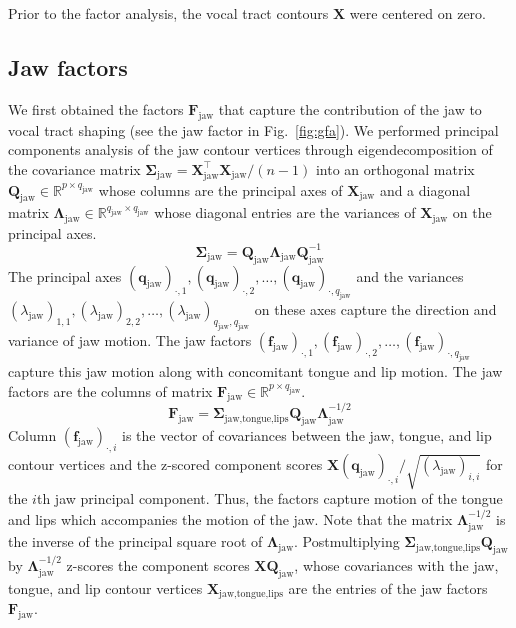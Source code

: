 \documentclass[reprint]{JASAnew}\usepackage[]{graphicx}\usepackage[]{color}
\begin{document}
Prior to the factor analysis, the vocal tract contours $\mathbf{X}$ were centered on zero.





\subsection{Jaw factors}
\label{subsec:jawfactors}

We first obtained the factors $\mathbf{F}_\text{jaw}$ that capture the contribution of the jaw to vocal tract shaping (see the jaw factor in Fig.~\ref{fig:gfa}). 
% 
We performed principal components analysis of the jaw contour vertices through eigendecomposition of the covariance matrix $\boldsymbol{\Sigma}_\text{jaw} = \mathbf{X}_\text{jaw}^\intercal \mathbf{X}_\text{jaw}/(n-1)$ into an orthogonal matrix $\mathbf{Q}_\text{jaw} \in \mathbb{R}^{p\times q_\text{jaw}}$ whose columns are the principal axes of $\mathbf{X}_\text{jaw}$ and a diagonal matrix $\boldsymbol{\Lambda}_\text{jaw} \in \mathbb{R}^{q_\text{jaw} \times q_\text{jaw}}$ whose diagonal entries are the variances of $\mathbf{X}_\text{jaw}$ on the principal axes.
% 
\begin{equation}
\boldsymbol{\Sigma}_\text{jaw} = \mathbf{Q}_\text{jaw}\boldsymbol{\Lambda}_\text{jaw} \mathbf{Q}_\text{jaw}^{-1}
\end{equation}
%
The principal axes $(\mathbf{q}_\text{jaw})_{\cdot,1}, (\mathbf{q}_\text{jaw})_{\cdot,2}, \ldots, (\mathbf{q}_\text{jaw})_{\cdot,q_\text{jaw}}$ and the variances $(\lambda_\text{jaw})_{1,1}, (\lambda_\text{jaw})_{2,2}, \ldots, (\lambda_\text{jaw})_{q_\text{jaw},q_\text{jaw}}$ on these axes capture the direction and variance of jaw motion. 
% 
The jaw factors $(\mathbf{f}_\text{jaw})_{\cdot,1},(\mathbf{f}_\text{jaw})_{\cdot,2},\ldots,(\mathbf{f}_\text{jaw})_{\cdot,q_\text{jaw}}$ capture this jaw motion along with concomitant tongue and lip motion.
% 
The jaw factors are the columns of matrix $\mathbf{F}_\text{jaw} \in \mathbb{R}^{p\times q_\text{jaw}}$. 
%
\begin{equation}
\mathbf{F}_\text{jaw}
 = \boldsymbol{\Sigma}_\text{jaw,tongue,lips} \mathbf{Q}_\text{jaw} \boldsymbol{\Lambda}_\text{jaw}^{-1/2}
\end{equation}
%
Column $(\mathbf{f}_\text{jaw})_{\cdot,i}$ is the vector of covariances between the jaw, tongue, and lip contour vertices and the z-scored component scores $\mathbf{X} (\mathbf{q}_\text{jaw})_{\cdot,i} / \sqrt{(\lambda_\text{jaw})_{i,i}}$ for the $i$th jaw principal component. 
%
Thus, the factors capture motion of the tongue and lips which accompanies the motion of the jaw. 
%
Note that the matrix $\boldsymbol{\Lambda}_\text{jaw}^{-1/2}$ is the inverse of the principal square root of $\boldsymbol{\Lambda}_\text{jaw}$.
%
Postmultiplying $\boldsymbol{\Sigma}_\text{jaw,tongue,lips} \mathbf{Q}_\text{jaw}$ by $\boldsymbol{\Lambda}_\text{jaw}^{-1/2}$ z-scores the component scores $\mathbf{X}\mathbf{Q}_\text{jaw}$, whose covariances with the jaw, tongue, and lip contour vertices $\mathbf{X}_\text{jaw,tongue,lips}$ are the entries of the jaw factors $\mathbf{F}_\text{jaw}$.
\end{document}
